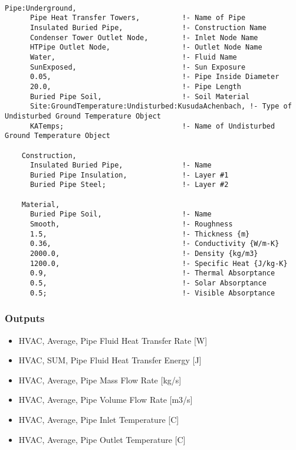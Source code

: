 \begin{lstlisting}

Pipe:Underground,
      Pipe Heat Transfer Towers,          !- Name of Pipe
      Insulated Buried Pipe,              !- Construction Name
      Condenser Tower Outlet Node,        !- Inlet Node Name
      HTPipe Outlet Node,                 !- Outlet Node Name
      Water,                              !- Fluid Name
      SunExposed,                         !- Sun Exposure
      0.05,                               !- Pipe Inside Diameter    
      20.0,                               !- Pipe Length
      Buried Pipe Soil,                   !- Soil Material
      Site:GroundTemperature:Undisturbed:KusudaAchenbach, !- Type of Undisturbed Ground Temperature Object
      KATemps;                            !- Name of Undisturbed Ground Temperature Object

    Construction,
      Insulated Buried Pipe,              !- Name
      Buried Pipe Insulation,             !- Layer #1
      Buried Pipe Steel;                  !- Layer #2

    Material,
      Buried Pipe Soil,                   !- Name
      Smooth,                             !- Roughness
      1.5,                                !- Thickness {m}
      0.36,                               !- Conductivity {W/m-K}
      2000.0,                             !- Density {kg/m3}
      1200.0,                             !- Specific Heat {J/kg-K}
      0.9,                                !- Thermal Absorptance
      0.5,                                !- Solar Absorptance
      0.5;                                !- Visible Absorptance
\end{lstlisting}

\subsubsection{Outputs}\label{outputs-8-004}

\begin{itemize}
\item
  HVAC, Average, Pipe Fluid Heat Transfer Rate {[}W{]}
\item
  HVAC, SUM, Pipe Fluid Heat Transfer Energy {[}J{]}
\item
  HVAC, Average, Pipe Mass Flow Rate {[}kg/s{]}
\item
  HVAC, Average, Pipe Volume Flow Rate {[}m3/s{]}
\item
  HVAC, Average, Pipe Inlet Temperature {[}C{]}
\item
  HVAC, Average, Pipe Outlet Temperature {[}C{]}
\end{itemize}

